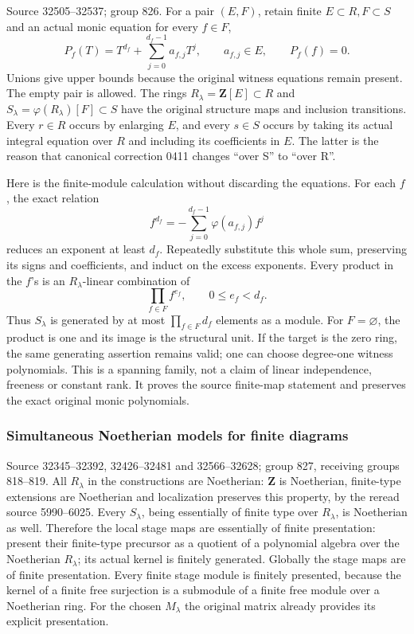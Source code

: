 Source 32505--32537; group 826. For a pair \((E,F)\), retain finite \(E\subset R,F\subset S\) and an actual monic equation for every \(f\in F\), \[
P_f(T)=T^{d_f}+\sum_{j=0}^{d_f-1}a_{f,j}T^j,\qquad
a_{f,j}\in E,\qquad P_f(f)=0.
\] Unions give upper bounds because the original witness equations remain present. The empty pair is allowed. The rings \(R_\lambda=\mathbf Z[E]\subset R\) and \(S_\lambda=\varphi(R_\lambda)[F]\subset S\) have the original structure maps and inclusion transitions. Every \(r\in R\) occurs by enlarging \(E\), and every \(s\in S\) occurs by taking its actual integral equation over \(R\) and including its coefficients in \(E\). The latter is the reason that canonical correction 0411 changes ``over S'' to ``over R''.

Here is the finite-module calculation without discarding the equations. For each \(f\), the exact relation \[
f^{d_f}=-\sum_{j=0}^{d_f-1}\varphi(a_{f,j})f^j
\] reduces an exponent at least \(d_f\). Repeatedly substitute this whole sum, preserving its signs and coefficients, and induct on the excess exponents. Every product in the \(f\)'s is an \(R_\lambda\)-linear combination of \[
\prod_{f\in F}f^{e_f},\qquad 0\le e_f<d_f.
\] Thus \(S_\lambda\) is generated by at most \(\prod_{f\in F}d_f\) elements as a module. For \(F=\varnothing\), the product is one and its image is the structural unit. If the target is the zero ring, the same generating assertion remains valid; one can choose degree-one witness polynomials. This is a spanning family, not a claim of linear independence, freeness or constant rank. It proves the source finite-map statement and preserves the exact original monic polynomials.

\subsubsection{Simultaneous Noetherian models for finite diagrams}\label{simultaneous-noetherian-models-for-finite-diagrams}

Source 32345--32392, 32426--32481 and 32566--32628; group 827, receiving groups 818--819. All \(R_\lambda\) in the constructions are Noetherian: \(\mathbf Z\) is Noetherian, finite-type extensions are Noetherian and localization preserves this property, by the reread source 5990--6025. Every \(S_\lambda\), being essentially of finite type over \(R_\lambda\), is Noetherian as well. Therefore the local stage maps are essentially of finite presentation: present their finite-type precursor as a quotient of a polynomial algebra over the Noetherian \(R_\lambda\); its actual kernel is finitely generated. Globally the stage maps are of finite presentation. Every finite stage module is finitely presented, because the kernel of a finite free surjection is a submodule of a finite free module over a Noetherian ring. For the chosen \(M_\lambda\) the original matrix already provides its explicit presentation.

